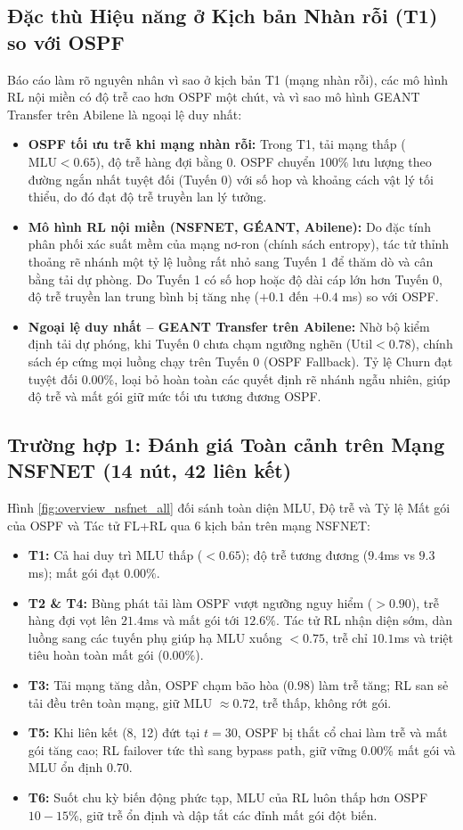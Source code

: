 \documentclass[11pt,a4paper]{article}
\begin{document}
\subsection{Đặc thù Hiệu năng ở Kịch bản Nhàn rỗi (T1) so với OSPF}
Báo cáo làm rõ nguyên nhân vì sao ở kịch bản T1 (mạng nhàn rỗi), các mô hình RL nội miền có độ trễ cao hơn OSPF một chút, và vì sao mô hình GEANT Transfer trên Abilene là ngoại lệ duy nhất:
\begin{itemize}
    \item \textbf{OSPF tối ưu trễ khi mạng nhàn rỗi:} Trong T1, tải mạng thấp ($\text{MLU} < 0.65$), độ trễ hàng đợi bằng $0$. OSPF chuyển $100\%$ lưu lượng theo đường ngắn nhất tuyệt đối (Tuyến 0) với số hop và khoảng cách vật lý tối thiểu, do đó đạt độ trễ truyền lan lý tưởng.
    \item \textbf{Mô hình RL nội miền (NSFNET, GÉANT, Abilene):} Do đặc tính phân phối xác suất mềm của mạng nơ-ron (chính sách entropy), tác tử thỉnh thoảng rẽ nhánh một tỷ lệ luồng rất nhỏ sang Tuyến 1 để thăm dò và cân bằng tải dự phòng. Do Tuyến 1 có số hop hoặc độ dài cáp lớn hơn Tuyến 0, độ trễ truyền lan trung bình bị tăng nhẹ ($+0.1$ đến $+0.4$ ms) so với OSPF.
    \item \textbf{Ngoại lệ duy nhất -- GEANT Transfer trên Abilene:} Nhờ bộ kiểm định tải dự phóng, khi Tuyến 0 chưa chạm ngưỡng nghẽn ($\text{Util} < 0.78$), chính sách ép cứng mọi luồng chạy trên Tuyến 0 (OSPF Fallback). Tỷ lệ Churn đạt tuyệt đối $0.00\%$, loại bỏ hoàn toàn các quyết định rẽ nhánh ngẫu nhiên, giúp độ trễ và mất gói giữ mức tối ưu tương đương OSPF.
\end{itemize}

\subsection{Trường hợp 1: Đánh giá Toàn cảnh trên Mạng NSFNET (14 nút, 42 liên kết)}
Hình \ref{fig:overview_nsfnet_all} đối sánh toàn diện MLU, Độ trễ và Tỷ lệ Mất gói của OSPF và Tác tử FL+RL qua 6 kịch bản trên mạng NSFNET:
\begin{itemize}
    \item \textbf{T1:} Cả hai duy trì MLU thấp ($< 0.65$); độ trễ tương đương ($9.4$ms vs $9.3$ms); mất gói đạt $0.00\%$.
    \item \textbf{T2 \& T4:} Bùng phát tải làm OSPF vượt ngưỡng nguy hiểm ($> 0.90$), trễ hàng đợi vọt lên $21.4$ms và mất gói tới $12.6\%$. Tác tử RL nhận diện sớm, dàn luồng sang các tuyến phụ giúp hạ MLU xuống $< 0.75$, trễ chỉ $10.1$ms và triệt tiêu hoàn toàn mất gói ($0.00\%$).
    \item \textbf{T3:} Tải mạng tăng dần, OSPF chạm bão hòa ($0.98$) làm trễ tăng; RL san sẻ tải đều trên toàn mạng, giữ MLU $\approx 0.72$, trễ thấp, không rớt gói.
    \item \textbf{T5:} Khi liên kết (8, 12) đứt tại $t=30$, OSPF bị thắt cổ chai làm trễ và mất gói tăng cao; RL failover tức thì sang bypass path, giữ vững $0.00\%$ mất gói và MLU ổn định $0.70$.
    \item \textbf{T6:} Suốt chu kỳ biến động phức tạp, MLU của RL luôn thấp hơn OSPF $10-15\%$, giữ trễ ổn định và dập tắt các đỉnh mất gói đột biến.
\end{itemize}
\end{document}
